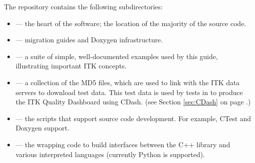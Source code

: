 The  repository contains the following subdirectories:
\begin{itemize}
        \item {} --- the heart of the software; the location
        of the majority of the source code.
        \item {} --- migration guides and Doxygen infrastructure.
        \item {} --- a suite of simple, well-documented
        examples used by this guide, illustrating important
        ITK concepts.
        \item {} --- a collection of the MD5 files, which are
used to link with the ITK data servers to download test data. This test data is
used by tests in  to produce the ITK Quality Dashboard using
CDash.
        (see Section \ref{sec:CDash} on page \pageref{sec:CDash}.)
        \item {} --- the scripts that support source code development. For example, CTest and Doxygen support.
        \item {} --- the wrapping code to build interfaces between the C++ library and various interpreted languages (currently Python is supported).
\end{itemize}

